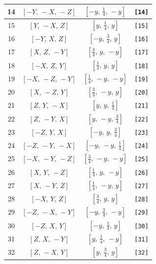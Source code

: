 \documentclass[fleqn,8pt]{jsarticle}
\begin{document}
\begin{longtable}{cccc}
14 & $\left[ - Y,\, - X,\, - Z \right]$ & $\left[ - y,\, \frac{1}{4},\, - y \right]$ & {\tt [14]} \\ \hline
15 & $\left[ Y,\, - X,\, Z \right]$ & $\left[ y,\, \frac{1}{4},\, y \right]$ & {\tt [15]} \\ \hline
16 & $\left[ - Y,\, X,\, Z \right]$ & $\left[ - y,\, \frac{3}{4},\, y \right]$ & {\tt [16]} \\ \hline
17 & $\left[ X,\, Z,\, - Y \right]$ & $\left[ \frac{3}{4},\, y,\, - y \right]$ & {\tt [17]} \\ \hline
18 & $\left[ - X,\, Z,\, Y \right]$ & $\left[ \frac{1}{4},\, y,\, y \right]$ & {\tt [18]} \\ \hline
19 & $\left[ - X,\, - Z,\, - Y \right]$ & $\left[ \frac{1}{4},\, - y,\, - y \right]$ & {\tt [19]} \\ \hline
20 & $\left[ X,\, - Z,\, Y \right]$ & $\left[ \frac{3}{4},\, - y,\, y \right]$ & {\tt [20]} \\ \hline
21 & $\left[ Z,\, Y,\, - X \right]$ & $\left[ y,\, y,\, \frac{1}{4} \right]$ & {\tt [21]} \\ \hline
22 & $\left[ Z,\, - Y,\, X \right]$ & $\left[ y,\, - y,\, \frac{3}{4} \right]$ & {\tt [22]} \\ \hline
23 & $\left[ - Z,\, Y,\, X \right]$ & $\left[ - y,\, y,\, \frac{3}{4} \right]$ & {\tt [23]} \\ \hline
24 & $\left[ - Z,\, - Y,\, - X \right]$ & $\left[ - y,\, - y,\, \frac{1}{4} \right]$ & {\tt [24]} \\ \hline
25 & $\left[ - X,\, - Y,\, - Z \right]$ & $\left[ \frac{3}{4},\, - y,\, - y \right]$ & {\tt [25]} \\ \hline
26 & $\left[ X,\, Y,\, - Z \right]$ & $\left[ \frac{1}{4},\, y,\, - y \right]$ & {\tt [26]} \\ \hline
27 & $\left[ X,\, - Y,\, Z \right]$ & $\left[ \frac{1}{4},\, - y,\, y \right]$ & {\tt [27]} \\ \hline
28 & $\left[ - X,\, Y,\, Z \right]$ & $\left[ \frac{3}{4},\, y,\, y \right]$ & {\tt [28]} \\ \hline
29 & $\left[ - Z,\, - X,\, - Y \right]$ & $\left[ - y,\, \frac{3}{4},\, - y \right]$ & {\tt [29]} \\ \hline
30 & $\left[ - Z,\, X,\, Y \right]$ & $\left[ - y,\, \frac{1}{4},\, y \right]$ & {\tt [30]} \\ \hline
31 & $\left[ Z,\, X,\, - Y \right]$ & $\left[ y,\, \frac{1}{4},\, - y \right]$ & {\tt [31]} \\ \hline
32 & $\left[ Z,\, - X,\, Y \right]$ & $\left[ y,\, \frac{3}{4},\, y \right]$ & {\tt [32]} \\ \hline

\end{longtable}
\end{document}
